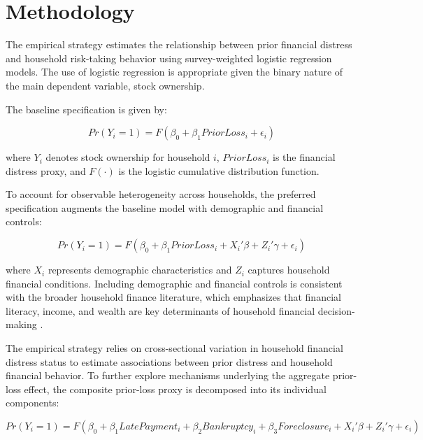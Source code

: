 \documentclass[12pt]{article}
\begin{document}


\section{Methodology}

The empirical strategy estimates the relationship between prior financial distress and household risk-taking behavior using survey-weighted logistic regression models. The use of logistic regression is appropriate given the binary nature of the main dependent variable, stock ownership.

\medskip
The baseline specification is given by:

\begin{equation}
Pr(Y_i = 1) = F(\beta_0 + \beta_1 PriorLoss_i + \epsilon_i)
\end{equation}

where $Y_i$ denotes stock ownership for household $i$, $PriorLoss_i$ is the financial distress proxy, and $F(\cdot)$ is the logistic cumulative distribution function.

\medskip
To account for observable heterogeneity across households, the preferred specification augments the baseline model with demographic and financial controls:

\begin{equation}
Pr(Y_i = 1) = F(\beta_0 + \beta_1 PriorLoss_i + X_i'\beta + Z_i'\gamma + \epsilon_i)
\end{equation}

where $X_i$ represents demographic characteristics and $Z_i$ captures household financial conditions. Including demographic and financial controls is consistent with the broader household finance literature, which emphasizes that financial literacy, income, and wealth are key determinants of household financial decision-making \cite{lusardi2014economic}.

\medskip
The empirical strategy relies on cross-sectional variation in household financial distress status to estimate associations between prior distress and household financial behavior. To further explore mechanisms underlying the aggregate prior-loss effect, the composite prior-loss proxy is decomposed into its individual components:

\begin{equation}
Pr(Y_i = 1) = F(\beta_0 + \beta_1 LatePayment_i + \beta_2 Bankruptcy_i + \beta_3 Foreclosure_i + X_i'\beta + Z_i'\gamma + \epsilon_i)
\end{equation}
\end{document}
